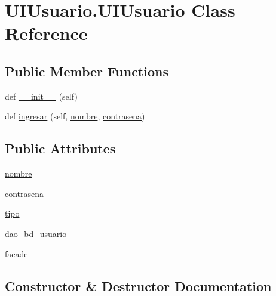 \hypertarget{class_u_i_usuario_1_1_u_i_usuario}{}\section{U\+I\+Usuario.\+U\+I\+Usuario Class Reference}
\label{class_u_i_usuario_1_1_u_i_usuario}
\subsection*{Public Member Functions}
\begin{DoxyCompactItemize}
\item 
def \mbox{\hyperlink{class_u_i_usuario_1_1_u_i_usuario_a1e65f56af297fce4d5b3ed7613f1d0fa}{\+\_\+\+\_\+init\+\_\+\+\_\+}} (self)
\item 
def \mbox{\hyperlink{class_u_i_usuario_1_1_u_i_usuario_ad83e1ef18f57b281a7708fd8ef0d3da4}{ingresar}} (self, \mbox{\hyperlink{class_u_i_usuario_1_1_u_i_usuario_a0a907891ebfe5679bbab53bf18e03b32}{nombre}}, \mbox{\hyperlink{class_u_i_usuario_1_1_u_i_usuario_a9763b58970d5e168cc76be6fc8560bef}{contrasena}})
\end{DoxyCompactItemize}
\subsection*{Public Attributes}
\begin{DoxyCompactItemize}
\item 
\mbox{\hyperlink{class_u_i_usuario_1_1_u_i_usuario_a0a907891ebfe5679bbab53bf18e03b32}{nombre}}
\item 
\mbox{\hyperlink{class_u_i_usuario_1_1_u_i_usuario_a9763b58970d5e168cc76be6fc8560bef}{contrasena}}
\item 
\mbox{\hyperlink{class_u_i_usuario_1_1_u_i_usuario_a8978cc3071fdc4a58afd844f4b25b689}{tipo}}
\item 
\mbox{\hyperlink{class_u_i_usuario_1_1_u_i_usuario_adf50015c7f5cfa3323ce947b4170fb8b}{dao\+\_\+bd\+\_\+usuario}}
\item 
\mbox{\hyperlink{class_u_i_usuario_1_1_u_i_usuario_a03b33bc6d21217abcdbaef28c27c24e9}{facade}}
\end{DoxyCompactItemize}


\subsection{Constructor \& Destructor Documentation}
\mbox{\label{class_u_i_usuario_1_1_u_i_usuario_a1e65f56af297fce4d5b3ed7613f1d0fa}} 
